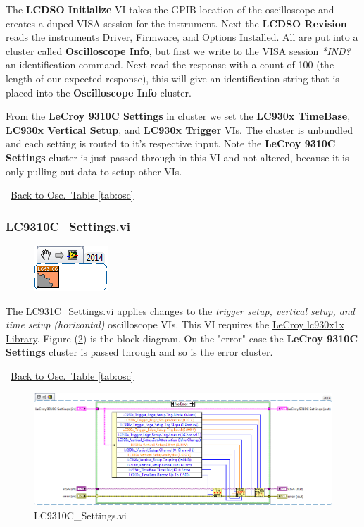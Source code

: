 \documentclass[11pt,a4paper,oldfontcommands]{memoir}
\begin{document}
The \textbf{LCDSO Initialize} VI takes the GPIB location of the oscilloscope and creates a duped VISA session for the instrument. Next the \textbf{LCDSO Revision} reads the instruments Driver, Firmware, and Options Installed. All are put into a cluster called \textbf{Oscilloscope Info}, but first we write to the VISA session \textit{*IND?} an identification command. Next read the response with a count of 100 (the length of our expected response), this will give an identification string that is placed into the \textbf{Oscilloscope Info} cluster.

From the \textbf{LeCroy 9310C Settings} in cluster we set the \textbf{LC930x TimeBase}, \textbf{LC930x Vertical Setup}, and \textbf{LC930x Trigger} VIs. The cluster is unbundled and each setting is routed to it's respective input. Note the \textbf{LeCroy 9310C Settings} cluster is just passed through in this VI and not altered, because it is only pulling out data to setup other VIs.

\noindent\hrulefill\, \hyperref[tab:osc]{Back to Osc.\ Table \ref{tab:osc}}

\subsubsection{LC9310C\_Settings.vi} \label{LC9310C_settings}
\noindent\hrulefill

\begin{figure}[h]
	\includegraphics[scale=0.625]{LC931C_settings_main_01}
	\label{fig:LC9310C_settings_main_01}
\end{figure}

The LC931C\_Settings.vi applies changes to the \textit{trigger setup, vertical setup, and time setup (horizontal)} oscilloscope VIs. This VI requires the \href{http://sine.ni.com/apps/utf8/niid_web_display.download_page?p_id_guid=E3B19B3E9608659CE034080020E74861}{LeCroy lc930x1x Library}. Figure (\ref{fig:LC9310C_settings_blkdig_01}) is the block diagram. On the "error" case the \textbf{LeCroy 9310C Settings} cluster is passed through and so is the error cluster.

\noindent\hrulefill\, \hyperref[tab:osc]{Back to Osc.\ Table \ref{tab:osc}}

\begin{figure}[H]
	\includegraphics[width=\textwidth,keepaspectratio]{LC931C_settings_blockdiagram_01}
	\caption{LC9310C\_Settings.vi}
	\label{fig:LC9310C_settings_blkdig_01}
\end{figure}
\end{document}

